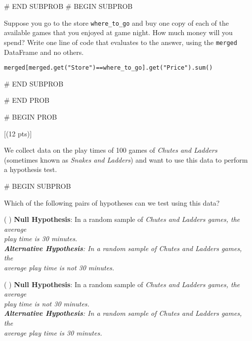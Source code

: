 \documentclass[twoside,12pt]{article}
\begin{document}
{    

# END SUBPROB
    # BEGIN SUBPROB


        Suppose you go to the store \texttt{where\_to\_go} and buy one copy of each of the available games that you enjoyed at game night. How much money will you spend? Write one line of code that evaluates to the answer, using the \texttt{merged} DataFrame and no others.

        \begin{responsebox}{1in}
            \texttt{merged[merged.get("Store")==where\_to\_go].get("Price").sum()}
        \end{responsebox}
    

# END SUBPROB




# END PROB


\newpage
# BEGIN PROB

[(12 pts)]

We collect data on the play times of 100 games of \textit{Chutes and Ladders} (sometimes known as \textit{Snakes and Ladders}) and want to use this data to perform a hypothesis test. 


    # BEGIN SUBPROB


        Which of the following pairs of hypotheses can we test using this data?

        \vspace{0.1in}

        ( ) \textbf{Null Hypothesis}: In a random sample of \textit{Chutes and Ladders games, the average \\
        \hspace*{1em} play time is 30 minutes.\\
        \hspace*{1em}\textbf{Alternative Hypothesis}: In a random sample of \textit{Chutes and Ladders} games, the \\
        \hspace*{1em}average play time is not 30 minutes.}

        \vspace{0.1in}

        ( ) \textbf{Null Hypothesis}: In a random sample of \textit{Chutes and Ladders games, the average \\
        \hspace*{1em} play time is not 30 minutes.\\
        \hspace*{1em}\textbf{Alternative Hypothesis}: In a random sample of \textit{Chutes and Ladders} games, the \\
        \hspace*{1em}average play time is 30 minutes.}

}
\end{document}
